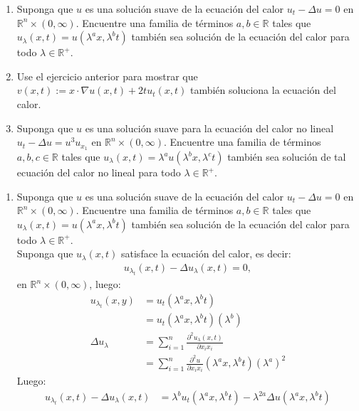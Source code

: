 \begin{homeworkProblem}
  \begin{enumerate}
    \item Suponga que $u$ es una solución suave de la ecuación del calor $u_t-\Delta u=0$ en $\mathbb{R}^{n}\times (0,\infty)$. Encuentre una familia de términos $a,b\in\mathbb{R}$ tales que $u_\lambda(x,t)=u(\lambda^ax,\lambda^bt)$ también sea solución de la ecuación del calor para todo $\lambda\in\mathbb{R}^{+}$.
    \item Use el ejercicio anterior para mostrar que $v(x,t):=x\cdot \nabla u(x,t)+2tu_t(x,t)$ también soluciona la ecuación del calor.
    \item Suponga que $u$ es una solución suave para la ecuación del calor no lineal $u_t-\Delta u=u^3u_{x_1}$ en $\mathbb{R}^{n}\times (0,\infty)$. Encuentre una familia de términos $a,b,c\in\mathbb{R}$ tales que $u_\lambda(x,t)=\lambda^au(\lambda^bx,\lambda^ct)$ también sea solución de tal ecuación del calor no lineal para todo $\lambda\in\mathbb{R}^{+}$. 
  \end{enumerate}
  \begin{solucion}
    \begin{enumerate}
      \item Suponga que $u$ es una solución suave de la ecuación del calor $u_t-\Delta u=0$ en $\mathbb{R}^{n}\times (0,\infty)$. Encuentre una familia de términos $a,b\in\mathbb{R}$ tales que $u_\lambda(x,t)=u(\lambda^ax,\lambda^bt)$ también sea solución de la ecuación del calor para todo $\lambda\in\mathbb{R}^{+}$.\\
        Suponga que $u_\lambda(x,t)$ satisface la ecuación del calor, es decir:
        \begin{align*}
          u_\lambda_{t}(x,t)-\Delta u_\lambda(x,t)=0,
        \end{align*}
        en $\mathbb{R}^{n} \times (0,\infty)$, luego:
        \begin{align*}
          u_\lambda_{t}(x,y)&=u_t(\lambda^ax,\lambda^bt)\\
          &=u_t(\lambda^ax,\lambda^bt)(\lambda^b)\\
          \Delta u_\lambda&=\sum_{i=1}^{n}\frac{\partial^2 u_\lambda(x,t)}{\partial x_ix_i}\\
          &=\sum_{i=1}^n\frac{\partial^2 u}{\partial x_ix_i}(\lambda^ax,\lambda^bt)(\lambda^a)^2
        \end{align*}
        Luego:
        \begin{align*}
          u_{\lambda_t}(x,t)-\Delta u_\lambda(x,t)&=\lambda^b u_t(\lambda^ax,\lambda^{b}t)-\lambda^{2a}\Delta u (\lambda^ax,\lambda^bt)\\

\end{align*}
\end{enumerate}
\end{solucion}
\end{homeworkProblem}

